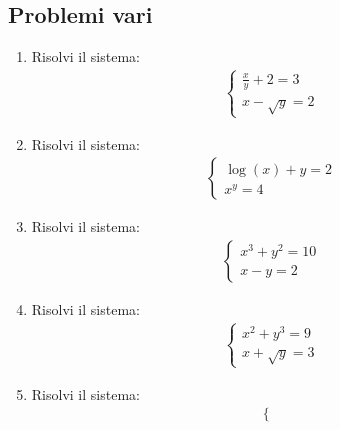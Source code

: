 \documentclass[letterpaper,10pt,italian]{jupyterBook}
\begin{document}
\subsection{Problemi vari}
\label{\detokenize{ch/algebra/real-n-algebra:problemi-vari}}\begin{enumerate}
%
\setcounter{enumi}{-1}
\item {} 
\sphinxAtStartPar
Risolvi il sistema:
\begin{equation*}
\begin{split}
   \begin{cases}
   \frac{x}{y} + 2 = 3 \\
   x - \sqrt{y} = 2
   \end{cases}
   \end{split}
\end{equation*}
\item {} 
\sphinxAtStartPar
Risolvi il sistema:
\begin{equation*}
\begin{split}
   \begin{cases}
   \log(x) + y = 2 \\
   x^y = 4
   \end{cases}
   \end{split}
\end{equation*}
\item {} 
\sphinxAtStartPar
Risolvi il sistema:
\begin{equation*}
\begin{split}
   \begin{cases}
   x^3 + y^2 = 10 \\
   x - y = 2
   \end{cases}
   \end{split}
\end{equation*}
\item {} 
\sphinxAtStartPar
Risolvi il sistema:
\begin{equation*}
\begin{split}
   \begin{cases}
   x^2 + y^3 = 9 \\
   x + \sqrt{y} = 3
   \end{cases}
   \end{split}
\end{equation*}
\item {} 
\sphinxAtStartPar
Risolvi il sistema:
\begin{equation*}
\begin{split}
   \begin{cases}

\end{cases}
\end{split}
\end{equation*}
\end{enumerate}
\end{document}
